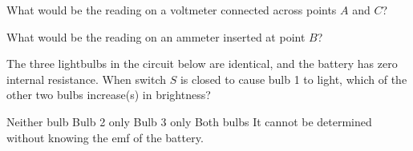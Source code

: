 \documentclass[12pt]{../oss-classkick-exam}
\begin{document}
\begin{questions}
  \uplevel{\rule{\linewidth}{.5pt}}

  \question What would be the reading on a voltmeter connected across points
  $A$ and $C$?
  \label{rcirc1}

  \question What would be the reading on an ammeter inserted at point $B$?
  \label{rcirc2}
  

  \uplevel{\rule{\linewidth}{.5pt}}
  
  \question The three lightbulbs in the circuit below are identical, and the
  battery has zero internal resistance. When switch $S$ is closed to cause
  bulb 1 to light, which of the other two bulbs increase(s) in brightness?

  \begin{minipage}{.3\linewidth}
  \end{minipage}
  \begin{minipage}{.64\linewidth}
    \begin{choices}
      \choice Neither bulb
      \choice Bulb 2 only
      \choice Bulb 3 only
      \choice Both bulbs
      \choice It cannot be determined without knowing the emf of the battery.
    \end{choices}
  \end{minipage}
  

\end{questions}
\end{document}
